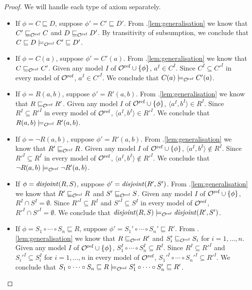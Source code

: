 \documentclass[
]{ceurart}
\begin{document}
\begin{proof} We will handle each type of axiom separately.
  \begin{itemize}
    \item If $\phi = C \sqsubseteq D$, suppose $\phi' = C' \sqsubseteq D'$. From .\ref{lem:generalisation} we know that $C' \sqsubseteq_{\mathcal{O}^\textnormal{ref}} C$ and $D \sqsubseteq_{\mathcal{O}^\textnormal{ref}} D'$. By transitivity of subsumption, we conclude that $C \sqsubseteq D \models_{\mathcal{O}^\textnormal{ref}} C' \sqsubseteq D'$.
    \item If $\phi = C(a)$, suppose $\phi' = C'(a)$. From .\ref{lem:generalisation} we know that $C \sqsubseteq_{\mathcal{O}^\textnormal{ref}} C'$. Given any model $I$ of ${\mathcal{O}^\textnormal{ref}} \cup \{ \phi \}$, $a^I \in C^I$. Since $C^I \subseteq C'^I$ in every model of ${\mathcal{O}^\textnormal{ref}}$, $a^I \in C'^I$. We conclude that $C(a) \models_{\mathcal{O}^\textnormal{ref}} C'(a)$.
    \item If $\phi = R(a, b)$, suppose $\phi' = R'(a, b)$. From .\ref{lem:generalisation} we know that $R \sqsubseteq_{\mathcal{O}^\textnormal{ref}} R'$. Given any model $I$ of ${\mathcal{O}^\textnormal{ref}} \cup \{ \phi \}$, $\langle a^I, b^I \rangle \in R^I$. Since $R^I \subseteq R'^I$ in every model of ${\mathcal{O}^\textnormal{ref}}$, $\langle a^I, b^I \rangle \in R'^I$. We conclude that $R(a, b) \models_{\mathcal{O}^\textnormal{ref}} R'(a, b)$.
    \item If $\phi = \lnot R(a, b)$, suppose $\phi' = R'(a, b)$. From .\ref{lem:generalisation} we know that $R' \sqsubseteq_{\mathcal{O}^\textnormal{ref}} R$. Given any model $I$ of ${\mathcal{O}^\textnormal{ref}} \cup \{ \phi \}$, $\langle a^I, b^I \rangle \not\in R^I$. Since $R'^I \subseteq R^I$ in every model of ${\mathcal{O}^\textnormal{ref}}$, $\langle a^I, b^I \rangle \not\in R'^I$. We conclude that $\lnot R(a, b) \models_{\mathcal{O}^\textnormal{ref}} \lnot R'(a, b)$.
    \item If $\phi = \mathit{disjoint}(R, S)$, suppose $\phi' = \mathit{disjoint}(R', S')$. From .\ref{lem:generalisation} we know that $R' \sqsubseteq_{\mathcal{O}^\textnormal{ref}} R$ and $S' \sqsubseteq_{\mathcal{O}^\textnormal{ref}} S$. Given any model $I$ of ${\mathcal{O}^\textnormal{ref}} \cup \{ \phi \}$, $R^I \cap S^I = \emptyset$. Since $R'^I \subseteq R^I$ and $S'^I \subseteq S^I$ in every model of ${\mathcal{O}^\textnormal{ref}}$, $R'^I \cap S'^I = \emptyset$. We conclude that $\mathit{disjoint}(R, S) \models_{\mathcal{O}^\textnormal{ref}} \mathit{disjoint}(R', S')$.
    \item If $\phi = S_1 \circ \cdots \circ S_n \sqsubseteq R$, suppose $\phi' = S_1' \circ \cdots \circ S_n' \sqsubseteq R'$. From .\ref{lem:generalisation} we know that $R \sqsubseteq_{\mathcal{O}^\textnormal{ref}} R'$ and $S_i' \sqsubseteq_{\mathcal{O}^\textnormal{ref}} S_i$ for $i = 1, \dots, n$. Given any model $I$ of ${\mathcal{O}^\textnormal{ref}} \cup \{ \phi \}$, $S_1^I \circ \cdots \circ S_n^I \subseteq R^I$. Since $R^I \subseteq R'^I$ and $S_i'^I \subseteq S_i^I$ for $i = 1, \dots, n$ in every model of ${\mathcal{O}^\textnormal{ref}}$, $S_1'^I \circ \cdots \circ S_n'^I \subseteq R'^I$. We conclude that $S_1 \circ \cdots \circ S_n \sqsubseteq R \models_{\mathcal{O}^\textnormal{ref}} S_1' \circ \cdots \circ S_n' \sqsubseteq R'$.
  \end{itemize}
\end{proof}
\end{document}
